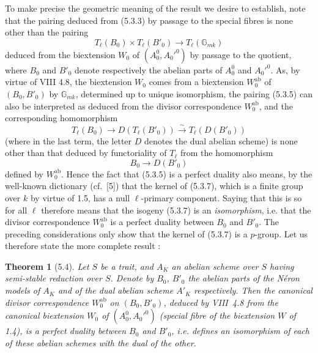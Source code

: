 \documentclass[11pt]{article}
\newtheorem{theoreme}[proposition]{Theorem}
\newcommand{\GG}{\mathbb G}
\newcommand{\Tl}{T_{\ell}}
\newcommand{\ab}{\mathrm{ab}}
\begin{document}
To make precise the geometric meaning of the result we desire to
establish, note that the pairing deduced from (5.3.3) by passage to the
special fibres is none other than the pairing
\begin{equation}
\Tl(B_0) \times \Tl(B'_0) \longrightarrow \Tl(\GG_{mk})
\end{equation}
deduced from the biextension $W_0$ of $(A_0^0, A_0'^0)$ by passage to
the quotient, where $B_0$ and $B'_0$ denote respectively the abelian
parts of $A_0^0$ and $A_0'^0$. As, by virtue of VIII 4.8, the
biextension $W_0$ comes from a biextension $W_0^{\ab}$ of $(B_0, B'_0)$
by $\GG_{mk}$, determined up to unique isomorphism, the pairing (5.3.5)
can also be interpreted as deduced from the divisor correspondence
$W_0^{\ab}$, and the corresponding homomorphism
\begin{equation}
\Tl(B_0) \longrightarrow D(\Tl(B'_0)) \overset{\sim}{\longrightarrow}
\Tl(D(B'_0))
\end{equation}
(where in the last term, the letter $D$ denotes the dual abelian scheme)
is none other than that deduced by functoriality of $\Tl$ from the
homomorphism
\begin{equation}
B_0 \longrightarrow D(B'_0)
\end{equation}
defined by $W_0^{\ab}$. Hence the fact that (5.3.5) is a perfect duality
also means, by the well-known dictionary (cf.~[5]) that the kernel of
(5.3.7), which is a finite group over $k$ by virtue of 1.5, has a null
$\ell$-primary component. Saying that this is so for all $\ell$ therefore
means that the isogeny (5.3.7) is an \emph{isomorphism}, i.e. that the
divisor correspondence $W_0^{\ab}$ is a perfect duality between $B_0$ and
$B'_0$. The preceding considerations only show that the kernel of (5.3.7)
is a $p$-group. Let us therefore state the more complete result :

\begin{theoreme}[5.4]
Let $S$ be a trait, and $A_K$ an abelian scheme over $S$ having
semi-stable reduction over $S$. Denote by $B_0$, $B'_0$ the abelian
parts of the N\'eron models of $A_K$ and of the dual abelian scheme
$A'_K$ respectively. Then the canonical divisor correspondence
$W_0^{\ab}$ on $(B_0, B'_0)$, deduced by VIII~4.8 from the canonical
biextension $W_0$ of $(A_0^0, A_0'^0)$ (special fibre of the biextension
$W$ of 1.4), is a perfect duality between $B_0$ and $B'_0$, i.e. defines
an isomorphism of each of these abelian schemes with the dual of the
other.
\end{theoreme}
\end{document}
